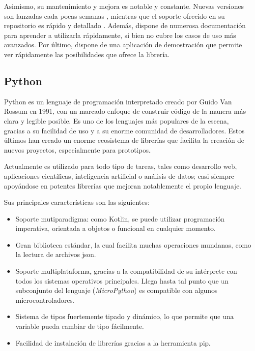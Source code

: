         
        Asimismo, su mantenimiento y mejora es notable y constante. Nuevas versiones son lanzadas cada pocas semanas \cite{goworowski_vico_2023-1}, mientras que el soporte ofrecido en su repositorio es rápido y detallado \cite{goworowski_vico_2023}. Además, dispone de numerosa documentación para aprender a utilizarla rápidamente, si bien no cubre los casos de uso más avanzados. Por último, dispone de una aplicación de demostración que permite ver rápidamente las posibilidades que ofrece la librería.

    \subsection{Python}
        Python es un lenguaje de programación interpretado creado por Guido Van Rossum en 1991, con un marcado enfoque de construir código de la manera más clara y legible posible. Es uno de los lenguajes más populares de la escena, gracias a su facilidad de uso y a su enorme comunidad de desarrolladores. Estos últimos han creado un enorme ecosistema de librerías que facilita la creación de nuevos proyectos, especialmente para prototipos.

        Actualmente es utilizado para todo tipo de tareas, tales como desarrollo web, aplicaciones científicas, inteligencia artificial o análisis de datos; casi siempre apoyándose en potentes librerías que mejoran notablemente el propio lenguaje. 

        Sus principales características son las siguientes:
        \begin{itemize}
            \item Soporte mutiparadigma: como Kotlin, se puede utilizar programación imperativa, orientada a objetos o funcional en cualquier momento.
            \item Gran biblioteca estándar, la cual facilita muchas operaciones mundanas, como la lectura de archivos \gls{json}.
            \item Soporte multiplataforma, gracias a la compatibilidad de su intérprete con todos los sistemas operativos principales. Llega hasta tal punto que un subconjunto del lenguaje (\textit{MicroPython}) es compatible con algunos microcontroladores.
            \item Sistema de tipos fuertemente tipado y dinámico, lo que permite que una variable pueda cambiar de tipo fácilmente.
            \item Facilidad de instalación de librerías gracias a la herramienta pip.
        \end{itemize}
    
